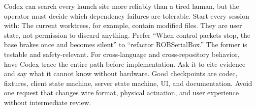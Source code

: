 {}Codex can search every launch site more reliably than a tired human, but the\markdownRendererSoftLineBreak
{}operator must decide which dependency failures are tolerable.\markdownRendererInterblockSeparator
{}\markdownRendererThematicBreak{}\markdownRendererInterblockSeparator
{}
\markdownRendererSectionEnd \markdownRendererSectionBegin
{}\markdownRendererInterblockSeparator
{}\markdownRendererSectionBegin
{}\markdownRendererInterblockSeparator
{}Start every session with:\markdownRendererInterblockSeparator
{}\markdownRendererInterblockSeparator
{}The current worktrees, for example, contain modified\markdownRendererSoftLineBreak
{} files. They are user state, not permission to\markdownRendererSoftLineBreak
{}discard anything.\markdownRendererInterblockSeparator
{}
\markdownRendererSectionEnd \markdownRendererSectionBegin
{}\markdownRendererInterblockSeparator
{}Prefer “When control packets stop, the base brakes once and becomes silent” to\markdownRendererSoftLineBreak
{}“refactor ROBSerialBox.” The former is testable and safety-relevant.\markdownRendererInterblockSeparator
{}
\markdownRendererSectionEnd \markdownRendererSectionBegin
{}\markdownRendererInterblockSeparator
{}For cross-language and cross-repository behavior, have Codex trace the entire\markdownRendererSoftLineBreak
{}path before implementation. Ask it to cite evidence and say what it cannot\markdownRendererSoftLineBreak
{}know without hardware.\markdownRendererInterblockSeparator
{}
\markdownRendererSectionEnd \markdownRendererSectionBegin
{}\markdownRendererInterblockSeparator
{}Good checkpoints are codec, fixtures, client state machine, server state\markdownRendererSoftLineBreak
{}machine, UI, and documentation. Avoid one request that changes wire format,\markdownRendererSoftLineBreak
{}physical actuation, and user experience without intermediate review.\markdownRendererInterblockSeparator
{}
\markdownRendererSectionEnd \markdownRendererSectionBegin
{}\markdownRendererInterblockSeparator
